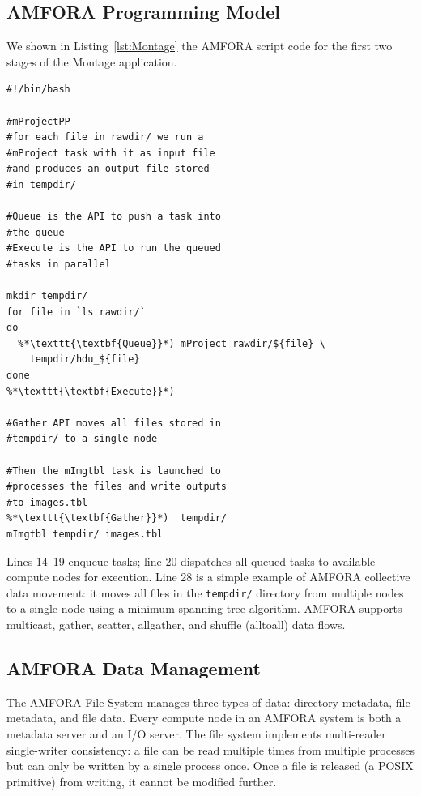 \documentclass{sig-alternate}
\begin{document}
\subsection{AMFORA Programming Model}
We shown in Listing~\ref{lst:Montage} the AMFORA script code for the first two stages of the Montage application.
\begin{lstlisting}[label=lst:Montage, caption=Parallel Script for Montage, xleftmargin=2.5ex]
#!/bin/bash

#mProjectPP
#for each file in rawdir/ we run a  
#mProject task with it as input file   
#and produces an output file stored  
#in tempdir/

#Queue is the API to push a task into 
#the queue
#Execute is the API to run the queued  
#tasks in parallel

mkdir tempdir/
for file in `ls rawdir/`
do
  %*\texttt{\textbf{Queue}}*) mProject rawdir/${file} \
    tempdir/hdu_${file}
done
%*\texttt{\textbf{Execute}}*) 

#Gather API moves all files stored in 
#tempdir/ to a single node

#Then the mImgtbl task is launched to
#processes the files and write outputs 
#to images.tbl
%*\texttt{\textbf{Gather}}*)  tempdir/
mImgtbl tempdir/ images.tbl 	    
\end{lstlisting}

Lines 14--19 enqueue tasks; line 20 dispatches all queued tasks  
to available compute nodes for execution. Line 28 is a simple example of AMFORA collective data movement:
it moves all files in the {\tt tempdir/} directory from multiple nodes to a single node using a minimum-spanning tree algorithm.
AMFORA supports multicast, gather, scatter, allgather, and shuffle (alltoall) data flows.

\subsection{AMFORA Data Management}
The AMFORA File System manages three types of data: directory metadata, file metadata, and file data.
Every compute node in an AMFORA system is both a metadata server and an I/O server. 
The file system implements multi-reader single-writer consistency: a file can be read multiple times from multiple processes but can only be written by a single process once. Once a file is released (a POSIX primitive) from writing, it cannot be modified further. 
\end{document}
